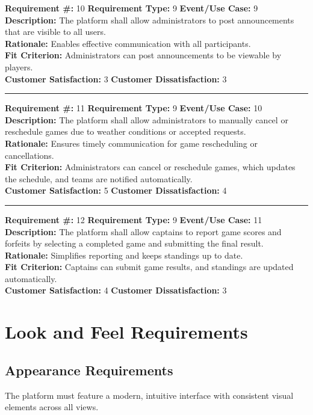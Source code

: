 \documentclass[12pt]{article}
\begin{document}
\textbf{Requirement \#:} 10 \quad \textbf{Requirement Type:} 9 \quad \textbf{Event/Use Case:} 9 \\
\textbf{Description:} The platform shall allow administrators to post announcements that are visible to all users.\\
\textbf{Rationale:} Enables effective communication with all participants.\\
\textbf{Fit Criterion:} Administrators can post announcements to be viewable by players.\\
\textbf{Customer Satisfaction:} 3 \quad\quad \textbf{Customer Dissatisfaction:} 3\\
\noindent\rule{\textwidth}{1pt}

\textbf{Requirement \#:} 11 \quad \textbf{Requirement Type:} 9 \quad \textbf{Event/Use Case:} 10 \\
\textbf{Description:} The platform shall allow administrators to manually cancel or reschedule games due to weather conditions or accepted requests.\\
\textbf{Rationale:} Ensures timely communication for game rescheduling or cancellations.\\
\textbf{Fit Criterion:} Administrators can cancel or reschedule games, which updates the schedule, and teams are notified automatically. \\
\textbf{Customer Satisfaction:} 5 \quad\quad \textbf{Customer Dissatisfaction:} 4\\
\noindent\rule{\textwidth}{1pt}

\textbf{Requirement \#:} 12 \quad \textbf{Requirement Type:} 9 \quad \textbf{Event/Use Case:} 11 \\
\textbf{Description:} The platform shall allow captains to report game scores and forfeits by selecting a completed game and submitting the final result.\\
\textbf{Rationale:} Simplifies reporting and keeps standings up to date.\\
\textbf{Fit Criterion:} Captains can submit game results, and standings are updated automatically. \\
\textbf{Customer Satisfaction:} 4 \quad\quad \textbf{Customer Dissatisfaction:} 3\\

\section{Look and Feel Requirements}
\subsection{Appearance Requirements}
The platform must feature a modern, intuitive interface with consistent visual elements across all views.
\end{document}

